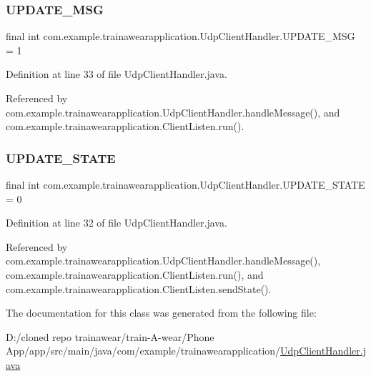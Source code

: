 \mbox{\label{classcom_1_1example_1_1trainawearapplication_1_1_udp_client_handler_ae0a5ca10db5db46916ca3a3acb7416b8}} 
\subsubsection{\texorpdfstring{UPDATE\_MSG}{UPDATE\_MSG}}
{\footnotesize\ttfamily final int com.\+example.\+trainawearapplication.\+Udp\+Client\+Handler.\+U\+P\+D\+A\+T\+E\+\_\+\+M\+SG = 1\hspace{0.3cm}{\ttfamily [static]}}



Definition at line 33 of file Udp\+Client\+Handler.\+java.



Referenced by com.\+example.\+trainawearapplication.\+Udp\+Client\+Handler.\+handle\+Message(), and com.\+example.\+trainawearapplication.\+Client\+Listen.\+run().

\mbox{\label{classcom_1_1example_1_1trainawearapplication_1_1_udp_client_handler_abb97ab46d1d8c23159f9ea1319425a5c}} 
\subsubsection{\texorpdfstring{UPDATE\_STATE}{UPDATE\_STATE}}
{\footnotesize\ttfamily final int com.\+example.\+trainawearapplication.\+Udp\+Client\+Handler.\+U\+P\+D\+A\+T\+E\+\_\+\+S\+T\+A\+TE = 0\hspace{0.3cm}{\ttfamily [static]}}



Definition at line 32 of file Udp\+Client\+Handler.\+java.



Referenced by com.\+example.\+trainawearapplication.\+Udp\+Client\+Handler.\+handle\+Message(), com.\+example.\+trainawearapplication.\+Client\+Listen.\+run(), and com.\+example.\+trainawearapplication.\+Client\+Listen.\+send\+State().



The documentation for this class was generated from the following file\+:\begin{DoxyCompactItemize}
\item 
D\+:/cloned repo trainawear/train-\/\+A-\/wear/\+Phone App/app/src/main/java/com/example/trainawearapplication/\mbox{\hyperlink{_udp_client_handler_8java}{Udp\+Client\+Handler.\+java}}\end{DoxyCompactItemize}
